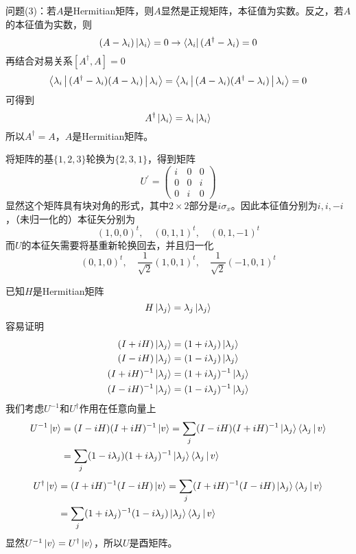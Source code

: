 问题(3)：若$A$是Hermitian矩阵，则$A$显然是正规矩阵，本征值为实数。反之，若$A$的本征值为实数，则
\[
(A-\lambda_i)\ket{\lambda_i} = 0 \rightarrow \bra{\lambda_i}(A^\dagger-\lambda_i) = 0
\]
再结合对易关系$[A^\dagger, A]=0$
\[
\Braket{\lambda_i|(A^\dagger-\lambda_i)(A-\lambda_i)|\lambda_i} = \Braket{\lambda_i|(A-\lambda_i)(A^\dagger-\lambda_i)|\lambda_i} = 0
\]
可得到
\[
A^\dagger\ket{\lambda_i} = \lambda_i\ket{\lambda_i}
\]
所以$A^\dagger=A$，$A$是Hermitian矩阵。

\exercise

将矩阵的基$\{1,2,3\}$轮换为$\{2,3,1\}$，得到矩阵
\[
U^\prime =
\begin{pmatrix}
i & 0 & 0 \\ 0 & 0 & i \\ 0 & i & 0
\end{pmatrix}
\]
显然这个矩阵具有块对角的形式，其中$2\times 2$部分是$i\sigma_x$。因此本征值分别为$i, i, -i$，（未归一化的）本征矢分别为
\[
(1,0,0)^t,\quad (0,1,1)^t,\quad (0,1,-1)^t
\]
而$U$的本征矢需要将基重新轮换回去，并且归一化
\[
(0,1,0)^t,\quad \frac{1}{\sqrt{2}}(1,0,1)^t,\quad \frac{1}{\sqrt{2}}(-1,0,1)^t
\]

\exercise

已知$H$是Hermitian矩阵
\[
H\ket{\lambda_j} = \lambda_j\ket{\lambda_j}
\]
容易证明
\begin{align*}
(I+iH)\ket{\lambda_j} &= (1+i\lambda_j)\ket{\lambda_j} \\
(I-iH)\ket{\lambda_j} &= (1-i\lambda_j)\ket{\lambda_j} \\
(I+iH)^{-1}\ket{\lambda_j} &= (1+i\lambda_j)^{-1}\ket{\lambda_j} \\
(I-iH)^{-1}\ket{\lambda_j} &= (1-i\lambda_j)^{-1}\ket{\lambda_j}
\end{align*}
我们考虑$U^{-1}$和$U^\dagger$作用在任意向量上
\[
\begin{split}
U^{-1}\ket{v} &= (I-iH)(I+iH)^{-1}\ket{v} = \sum\limits_j (I-iH)(I+iH)^{-1}\ket{\lambda_j}\Braket{\lambda_j|v} \\
&= \sum\limits_j (1-i\lambda_j)(1+i\lambda_j)^{-1}\ket{\lambda_j}\Braket{\lambda_j|v}
\end{split}
\]
\[
\begin{split}
U^\dagger\ket{v} &= (I+iH)^{-1}(I-iH)\ket{v} = \sum\limits_j (I+iH)^{-1}(I-iH)\ket{\lambda_j}\Braket{\lambda_j|v} \\
&= \sum\limits_j (1+i\lambda_j)^{-1}(1-i\lambda_j)\ket{\lambda_j}\Braket{\lambda_j|v}
\end{split}
\]
显然$U^{-1}\ket{v}=U^\dagger\ket{v}$，所以$U$是酉矩阵。

